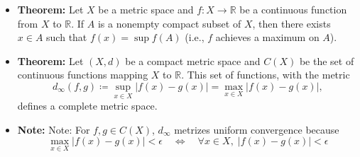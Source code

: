 \documentclass[11pt,twoside]{report}
\newcommand{\bbR}{{\mathbb{R}}}
\begin{document}
\begin{itemize}
\begin{itemize}
 \item Since the space is complete, every Cauchy sequence is convergent. 


\end{itemize}



\item \textbf{Theorem:}  Let $X$ be a metric space and $f \colon X\rightarrow \bbR$ be a continuous function from $X$ to $\mathbb{R}$. If $A$ is a nonempty compact subset of $X$, then there exists $x\in A$ such that $f(x)=\sup f(A)$ (i.e., $f$ achieves a maximum on $A$).

\item \textbf{Theorem:}  
Let $(X,d)$ be a compact metric space and $C(X)$ be the set of continuous functions mapping $X$ to $\mathbb{R}$.
This set of functions, with the metric 
 \[
 d_\infty (f,g) \coloneqq \sup_{x\in X} |f(x)-g(x)| = \max_{x\in X} |f(x)-g(x)|,
 \] defines a complete metric space.


\item \textbf{Note:}  Note: For $f,g\in C(X)$, $d_\infty$ metrizes uniform convergence because 
\[
\max_{x\in X} |f(x)-g(x)| < \epsilon  \quad \iff \quad  \forall x\in X, \;  |f(x) - g(x)| < \epsilon
 \]


\end{itemize}







 
\end{document}
